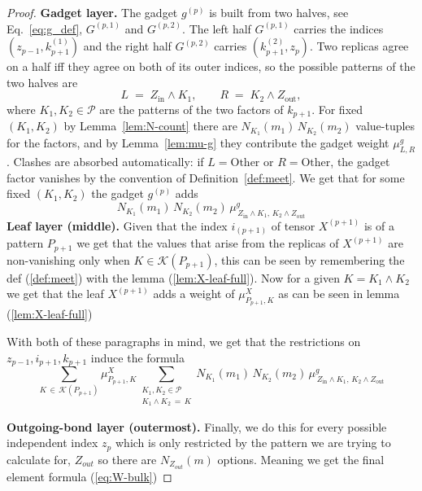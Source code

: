 \documentclass[12pt,a4paper]{article}
\begin{document}
\begin{proof}
\smallskip\noindent\textbf{Gadget layer.} 
The gadget $g^{(p)}$ is built from two halves, see Eq.~\ref{eq:g_def}, 
$G^{(p,1)}$ and $G^{(p,2)}$. The left half $G^{(p,1)}$ carries the 
indices $(z_{p-1}, k^{(1)}_{p+1})$ and the right half $G^{(p,2)}$ 
carries $(k^{(2)}_{p+1}, z_{p})$. Two replicas agree on a half iff 
they agree on both of its outer indices, so the possible patterns of the two 
halves are
\[
L \;=\; Z_{\mathrm{in}} \wedge K_{1}, \qquad 
R \;=\; K_{2} \wedge Z_{\mathrm{out}},
\]
where $K_{1}, K_{2} \in \mathcal{P}$ are the patterns of the two factors of $k_{p+1}$. 
For fixed $(K_{1}, K_{2})$ by Lemma~\ref{lem:N-count} there are $N_{K_{1}}(m_{1})\, N_{K_{2}}(m_{2})$ value-tuples for the factors, and by Lemma~\ref{lem:mu-g} they contribute the gadget weight 
$\mu^{g}_{L, R}$. Clashes are absorbed automatically: if $L = \mathrm{Other}$ or $R = \mathrm{Other}$, the gadget factor vanishes by the convention of Definition~\ref{def:meet}.
We get that for some fixed $(K_1,K_2)$  the gadget $g^{(p)}$ adds $$N_{K_{1}}(m_{1})\, N_{K_{2}}(m_{2})\,
\mu^{g}_{\,Z_{\mathrm{in}} \wedge K_{1},\, K_{2} \wedge Z_{\mathrm{out}}}$$
\smallskip\noindent\textbf{Leaf layer (middle).} 
Given that the index $i_{(p+1)}$  of tensor $X^{(p+1)}$ is of a pattern $P_{p+1}$ we get that the values that arise from the replicas of $X^{(p+1)}$ are non-vanishing only when $K\in\mathcal{K}(P_{p+1})$, this can be seen by remembering the def (\ref{def:meet})  with the lemma (\ref{lem:X-leaf-full}).
Now for a given $K=K_1\land K_2$  we get that the leaf $X^{(p+1)}$  adds a weight of $\mu_{P_{p+1},K}^X$   as can be seen in lemma (\ref{lem:X-leaf-full})

With both of these paragraphs in mind, we get that the restrictions on $z_{p-1},i_{p+1},k_{p+1}$  induce the formula $$\sum_{K \,\in\, \mathcal{K}(P_{p+1})}\!\! \mu^{X}_{P_{p+1}, K}
\!\!\!\!\sum_{\substack{K_{1}, K_{2} \in \mathcal{P} \\ K_{1} \wedge K_{2} \,=\, K}}\!\!\!\!
N_{K_{1}}(m_{1})\, N_{K_{2}}(m_{2})\,
\mu^{g}_{\,Z_{\mathrm{in}} \wedge K_{1},\, K_{2} \wedge Z_{\mathrm{out}}}$$

\smallskip\noindent\textbf{Outgoing-bond layer (outermost).} 
Finally, we do this for every possible independent index $z_{p}$  which is only restricted by the pattern we are trying to calculate for, $Z_{out}$  so there are $N_{Z_{out}}(m)$  options. Meaning we get the final element formula (\ref{eq:W-bulk})
\end{proof}
\end{document}
